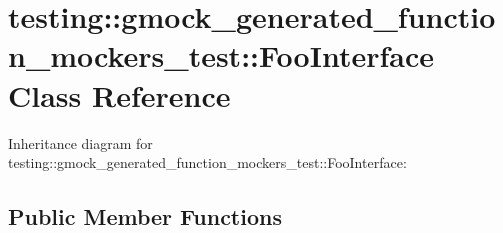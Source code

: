 \hypertarget{classtesting_1_1gmock__generated__function__mockers__test_1_1FooInterface}{}\section{testing\+:\+:gmock\+\_\+generated\+\_\+function\+\_\+mockers\+\_\+test\+:\+:Foo\+Interface Class Reference}
\label{classtesting_1_1gmock__generated__function__mockers__test_1_1FooInterface}


Inheritance diagram for testing\+:\+:gmock\+\_\+generated\+\_\+function\+\_\+mockers\+\_\+test\+:\+:Foo\+Interface\+:
\subsection*{Public Member Functions}
